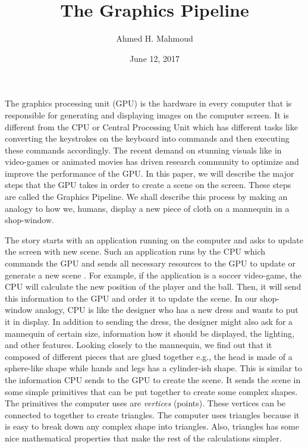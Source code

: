 \documentclass[12pt] {article}
\begin{document}
\title{The Graphics Pipeline}
\author{Ahmed H. Mahmoud}
\date{June 12, 2017} 

\maketitle
The graphics processing unit (GPU) is the hardware in every computer that is responsible for generating and displaying images on the computer screen. It is different from the CPU or Central Processing Unit which has different tasks like converting the keystrokes on the keyboard into commands and then executing these commands accordingly. The recent demand on stunning visuals like in video-games or animated movies has driven research community to optimize and improve the performance of the GPU. In this paper, we will describe the major steps that the GPU takes in order to create a scene on the screen. These steps are called the Graphics Pipeline. We shall describe this process by making an analogy to how we, humans, display a new piece of cloth on a mannequin in a shop-window. 

The story starts with an application running on the computer and asks to update the screen with new scene. Such an application runs by the CPU which commands the GPU and sends all necessary resources to the GPU to update or generate a new scene \cite{wei2005crash}. For example, if the application is a soccer video-game, the CPU will calculate the new position of the player and the ball. Then, it will send this information to the GPU and order it to update the scene. In our shop-window analogy, CPU is like the designer who has a new dress and wants to put it in display. In addition to sending the dress, the designer might also ask  for a mannequin of certain size, information how it should be displayed, the lighting, and other features. Looking closely to the mannequin, we find out that it composed of different pieces that are glued together e.g., the head is made of a sphere-like shape while hands and legs has a cylinder-ish shape. This is similar to the information CPU sends to the GPU to create the scene. It sends the scene in some simple primitives that can be put together to create some complex shapes. The primitives the computer uses are \emph{vertices} (points). These vertices can be connected to together to create triangles. The computer uses triangles because it is easy to break down any complex shape into triangles. Also, triangles has some nice mathematical properties that make the rest of the calculations simpler. 
\end{document}
